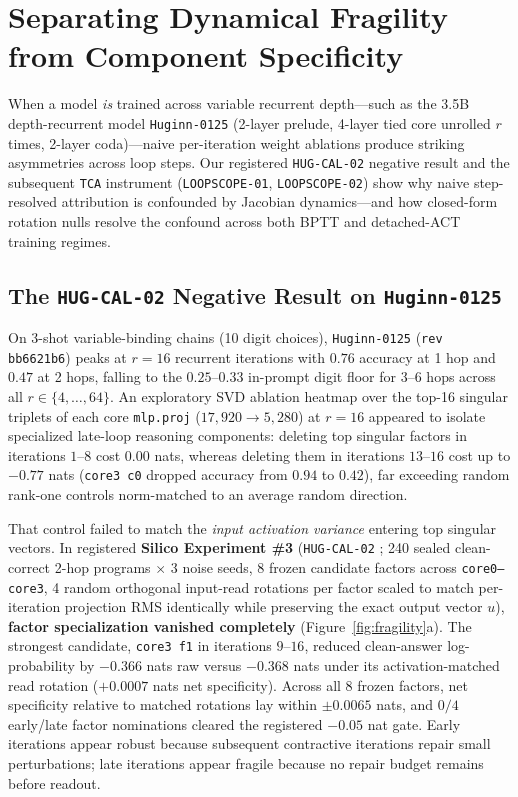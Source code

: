\documentclass[10pt,letterpaper]{article}
\begin{document}
\section{Separating Dynamical Fragility from Component Specificity}\label{sec:fragility}

When a model \emph{is} trained across variable recurrent depth—such as the 3.5B depth-recurrent model \texttt{Huginn-0125} \cite{geiping2025huginn} (2-layer prelude, 4-layer tied core unrolled $r$ times, 2-layer coda)—naive per-iteration weight ablations produce striking asymmetries across loop steps. Our registered \texttt{HUG-CAL-02} negative result \cite{dugan2026hugcal} and the subsequent \texttt{TCA} instrument (\texttt{LOOPSCOPE-01}, \texttt{LOOPSCOPE-02}) show why naive step-resolved attribution is confounded by Jacobian dynamics—and how closed-form rotation nulls resolve the confound across both BPTT and detached-ACT training regimes.

\subsection{The \texttt{HUG-CAL-02} Negative Result on \texttt{Huginn-0125}}

On 3-shot variable-binding chains (10 digit choices), \texttt{Huginn-0125} (\texttt{rev bb6621b6}) peaks at $r=16$ recurrent iterations with $0.76$ accuracy at 1 hop and $0.47$ at 2 hops, falling to the $0.25$--$0.33$ in-prompt digit floor for $3$--$6$ hops across all $r \in \{4,\dots,64\}$. An exploratory SVD ablation heatmap over the top-16 singular triplets of each core \texttt{mlp.proj} ($17{,}920 \to 5{,}280$) at $r=16$ appeared to isolate specialized late-loop reasoning components: deleting top singular factors in iterations $1$--$8$ cost $0.00$ nats, whereas deleting them in iterations $13$--$16$ cost up to $-0.77$ nats (\texttt{core3 c0} dropped accuracy from $0.94$ to $0.42$), far exceeding random rank-one controls norm-matched to an average random direction.

That control failed to match the \emph{input activation variance} entering top singular vectors. In registered \textbf{Silico Experiment \#3} (\texttt{HUG-CAL-02} \cite{dugan2026hugcal}; 240 sealed clean-correct 2-hop programs $\times$ 3 noise seeds, 8 frozen candidate factors across \texttt{core0--core3}, 4 random orthogonal input-read rotations per factor scaled to match per-iteration projection RMS identically while preserving the exact output vector $u$), \textbf{factor specialization vanished completely} (Figure~\ref{fig:fragility}a). The strongest candidate, \texttt{core3 f1} in iterations $9$--$16$, reduced clean-answer log-probability by $-0.366$ nats raw versus $-0.368$ nats under its activation-matched read rotation ($+0.0007$ nats net specificity). Across all 8 frozen factors, net specificity relative to matched rotations lay within $\pm 0.0065$ nats, and $0/4$ early/late factor nominations cleared the registered $-0.05$ nat gate. Early iterations appear robust because subsequent contractive iterations repair small perturbations; late iterations appear fragile because no repair budget remains before readout.
\end{document}
